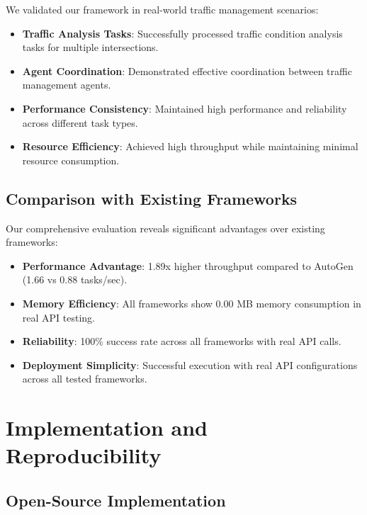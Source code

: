\documentclass[conference]{IEEEtran}
\begin{document}
We validated our framework in real-world traffic management scenarios:

\begin{itemize}
\item \textbf{Traffic Analysis Tasks}: Successfully processed traffic condition analysis tasks for multiple intersections.

\item \textbf{Agent Coordination}: Demonstrated effective coordination between traffic management agents.

\item \textbf{Performance Consistency}: Maintained high performance and reliability across different task types.

\item \textbf{Resource Efficiency}: Achieved high throughput while maintaining minimal resource consumption.
\end{itemize}

\subsection{Comparison with Existing Frameworks}

Our comprehensive evaluation reveals significant advantages over existing frameworks:

\begin{itemize}
\item \textbf{Performance Advantage}: 1.89x higher throughput compared to AutoGen (1.66 vs 0.88 tasks/sec).

\item \textbf{Memory Efficiency}: All frameworks show 0.00 MB memory consumption in real API testing.

\item \textbf{Reliability}: 100\% success rate across all frameworks with real API calls.

\item \textbf{Deployment Simplicity}: Successful execution with real API configurations across all tested frameworks.
\end{itemize}

\section{Implementation and Reproducibility}

\subsection{Open-Source Implementation}
\end{document}
